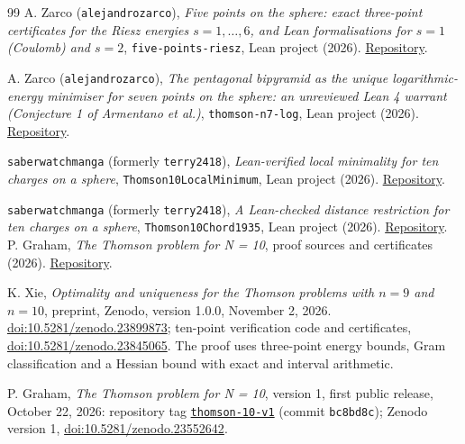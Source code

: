 \documentclass[11pt]{article}
\begin{document}
\begin{thebibliography}{99}
A. Zarco (\texttt{alejandrozarco}), \emph{Five points on the sphere: exact three-point certificates for the
Riesz energies $s = 1, \dots, 6$, and Lean formalisations for $s = 1$
(Coulomb) and $s = 2$}, \texttt{five-points-riesz},
Lean project (2026).
\href{https://github.com/alejandrozarco/five-points-riesz/blob/aeb4588ccbb1ccb91c315fedeb79a18042b5fe13/README.md}{Repository}.

A. Zarco (\texttt{alejandrozarco}), \emph{The pentagonal bipyramid as the unique
logarithmic-energy minimiser for seven points on the sphere: an unreviewed
Lean 4 warrant (Conjecture 1 of Armentano et al.)},
\texttt{thomson-n7-log}, Lean project (2026).
\href{https://github.com/alejandrozarco/thomson-n7-log/blob/fd2f8b2e7eb0e89ba4f82f6d2c3e98862f89bc28/README.md}{Repository}.

\texttt{saberwatchmanga} (formerly \texttt{terry2418}),
\emph{Lean-verified local minimality for ten charges on a sphere},
\texttt{Thomson10LocalMinimum}, Lean project (2026).
\href{https://github.com/saberwatchmanga/-lean-finite-certificates/blob/7ba9eb38db36c9cb957ff26758b66bbacc31d8bc/Thomson10LocalMinimum/README.md}{Repository}.

\texttt{saberwatchmanga} (formerly \texttt{terry2418}),
\emph{A Lean-checked distance restriction for ten charges on a sphere},
\texttt{Thomson10Chord1935}, Lean project (2026).
\href{https://github.com/saberwatchmanga/-lean-finite-certificates/blob/bc74bc050f4c39123e894b3fd3873ba17f60289a/Thomson10Chord1935/README.md}{Repository}.
P. Graham, \emph{The Thomson problem for N = 10}, proof sources and
certificates (2026).
\href{https://github.com/6/clank-lab/tree/e987408cf2d4c27c6e0c10d9f1a522ce3156c632/results/thomson-10}{Repository}.

K. Xie, \emph{Optimality and uniqueness for the Thomson problems with
$n=9$ and $n=10$}, preprint, Zenodo, version 1.0.0, November 2, 2026.
\href{https://doi.org/10.5281/zenodo.23899873}{doi:10.5281/zenodo.23899873};
ten-point verification code and certificates,
\href{https://doi.org/10.5281/zenodo.23845065}{doi:10.5281/zenodo.23845065}.
The proof uses three-point energy bounds, Gram classification and a Hessian
bound with exact and interval arithmetic.

P. Graham, \emph{The Thomson problem for N = 10}, version 1, first public
release, October 22, 2026: repository tag
\href{https://github.com/6/clank-lab/tree/thomson-10-v1/results/thomson-10}{\texttt{thomson-10-v1}}
(commit \texttt{bc8bd8c});
Zenodo version 1, \href{https://doi.org/10.5281/zenodo.23552642}{doi:10.5281/zenodo.23552642}.


\end{thebibliography}
\end{document}
